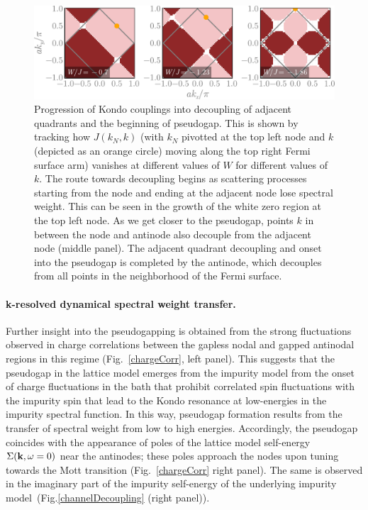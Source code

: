 \documentclass[%
 reprint,
superscriptaddress,
groupedaddress,
 amsmath,amssymb,
 aps,
prl
]{revtex4-2}
\begin{document}
\begin{figure}[htpb]
    \centering
    \includegraphics[width=\linewidth]{zerosFlow.pdf}
    \caption{Progression of Kondo couplings into decoupling of adjacent quadrants and the beginning of pseudogap. This is shown by tracking how $J(k_N, k)$ (with $k_N$ pivotted at the top left node and $k$ (depicted as an orange circle) moving along the top right Fermi surface arm) vanishes at different values of $W$ for different values of $k$. The route towards decoupling begins as scattering processes starting from the node and ending at the adjacent node lose spectral weight. This can be seen in the growth of the white zero region at the top left node. As we get closer to the pseudogap, points $k$ in between the node and antinode also decouple from the adjacent node (middle panel). The adjacent quadrant decoupling and onset into the pseudogap is completed by the antinode, which decouples from all points in the neighborhood of the Fermi surface.}
    \label{rgProgression}
\end{figure}

\paragraph*{{\bf k}-resolved dynamical spectral weight transfer.} 
Further insight into the pseudogapping 
is obtained from the strong fluctuations observed in charge correlations between the gapless nodal and gapped antinodal regions in this 
regime
(Fig.~\ref{chargeCorr}, left panel). This suggests that the 
pseudogap in the lattice model
emerges from the impurity model from the 
onset of charge fluctuations in the bath that prohibit correlated spin fluctuations with the impurity spin that
lead to the 
Kondo resonance at low-energies in the impurity spectral function. In this way, pseudogap formation 
results from the transfer of spectral weight from low to high energies. Accordingly, the pseudogap coincides 
with the appearance of poles of the lattice model self-energy $\Sigma ({\bf k},\omega=0)$
near the antinodes; these poles approach the nodes 
upon tuning towards the Mott transition
(Fig.~\ref{chargeCorr} right panel). The same is observed in the imaginary part of the impurity self-energy of the underlying impurity model~(Fig.\ref{channelDecoupling} (right panel)). 
\end{document}
